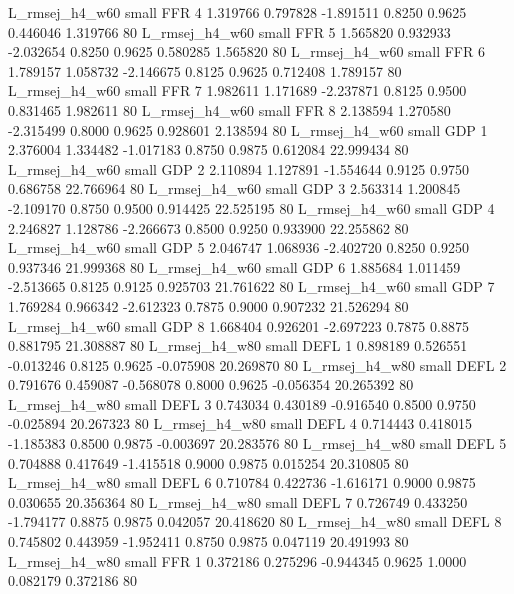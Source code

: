 L_rmsej_h4_w60      small      FFR                 4 1.319766 0.797828 -1.891511 0.8250 0.9625  0.446046    1.319766 80
L_rmsej_h4_w60      small      FFR                 5 1.565820 0.932933 -2.032654 0.8250 0.9625  0.580285    1.565820 80
L_rmsej_h4_w60      small      FFR                 6 1.789157 1.058732 -2.146675 0.8125 0.9625  0.712408    1.789157 80
L_rmsej_h4_w60      small      FFR                 7 1.982611 1.171689 -2.237871 0.8125 0.9500  0.831465    1.982611 80
L_rmsej_h4_w60      small      FFR                 8 2.138594 1.270580 -2.315499 0.8000 0.9625  0.928601    2.138594 80
L_rmsej_h4_w60      small      GDP                 1 2.376004 1.334482 -1.017183 0.8750 0.9875  0.612084   22.999434 80
L_rmsej_h4_w60      small      GDP                 2 2.110894 1.127891 -1.554644 0.9125 0.9750  0.686758   22.766964 80
L_rmsej_h4_w60      small      GDP                 3 2.563314 1.200845 -2.109170 0.8750 0.9500  0.914425   22.525195 80
L_rmsej_h4_w60      small      GDP                 4 2.246827 1.128786 -2.266673 0.8500 0.9250  0.933900   22.255862 80
L_rmsej_h4_w60      small      GDP                 5 2.046747 1.068936 -2.402720 0.8250 0.9250  0.937346   21.999368 80
L_rmsej_h4_w60      small      GDP                 6 1.885684 1.011459 -2.513665 0.8125 0.9125  0.925703   21.761622 80
L_rmsej_h4_w60      small      GDP                 7 1.769284 0.966342 -2.612323 0.7875 0.9000  0.907232   21.526294 80
L_rmsej_h4_w60      small      GDP                 8 1.668404 0.926201 -2.697223 0.7875 0.8875  0.881795   21.308887 80
L_rmsej_h4_w80      small     DEFL                 1 0.898189 0.526551 -0.013246 0.8125 0.9625 -0.075908   20.269870 80
L_rmsej_h4_w80      small     DEFL                 2 0.791676 0.459087 -0.568078 0.8000 0.9625 -0.056354   20.265392 80
L_rmsej_h4_w80      small     DEFL                 3 0.743034 0.430189 -0.916540 0.8500 0.9750 -0.025894   20.267323 80
L_rmsej_h4_w80      small     DEFL                 4 0.714443 0.418015 -1.185383 0.8500 0.9875 -0.003697   20.283576 80
L_rmsej_h4_w80      small     DEFL                 5 0.704888 0.417649 -1.415518 0.9000 0.9875  0.015254   20.310805 80
L_rmsej_h4_w80      small     DEFL                 6 0.710784 0.422736 -1.616171 0.9000 0.9875  0.030655   20.356364 80
L_rmsej_h4_w80      small     DEFL                 7 0.726749 0.433250 -1.794177 0.8875 0.9875  0.042057   20.418620 80
L_rmsej_h4_w80      small     DEFL                 8 0.745802 0.443959 -1.952411 0.8750 0.9875  0.047119   20.491993 80
L_rmsej_h4_w80      small      FFR                 1 0.372186 0.275296 -0.944345 0.9625 1.0000  0.082179    0.372186 80
